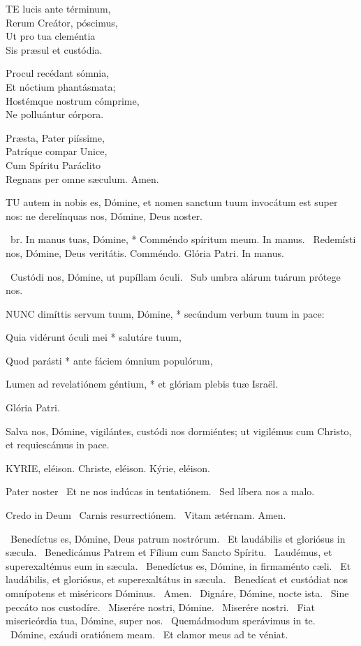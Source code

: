 \lettrine[lines=2]{T}{E} lucis ante términum,\\
Rerum Creátor, póscimus,\\
Ut pro tua cleméntia\\
Sis præsul et custódia.

Procul recédant sómnia,\\
Et nóctium phantásmata;\\
Hostémque nostrum cómprime,\\
Ne polluántur córpora.

Præsta, Pater piíssime,\\
Patríque compar Unice,\\
Cum Spíritu Paráclito\\
Regnans per omne sæculum. Amen.


\lettrine[lines=2]{T}{U} autem in nobis es, Dómine, et nomen sanctum tuum invocátum est super nos: ne derelínquas nos, Dómine, Deus noster.

\R\ br. In manus tuas, Dómine, * Comméndo spíritum meum. In manus. \V\ Redemísti nos, Dómine, Deus veritátis. Comméndo. Glória Patri. In manus.

\V\ Custódi nos, Dómine, ut pupíllam óculi. \R\ Sub umbra alárum tuárum prótege nos.


\lettrine[lines=2]{N}{UNC} dimíttis servum tuum, Dómine, * secúndum verbum tuum in pace:

Quia vidérunt óculi mei * salutáre tuum,

Quod parásti * ante fáciem ómnium populórum,

Lumen ad revelatiónem géntium, * et glóriam plebis tuæ Israël.

Glória Patri.

 Salva nos, Dómine, vigilántes, custódi nos dormiéntes; ut vigilémus cum Christo, et requiescámus in pace.


KYRIE, eléison. Christe, eléison. Kýrie, eléison.

Pater noster  \V\ Et ne nos indúcas in tentatiónem. \R\ Sed líbera nos a malo.

Credo in Deum  \V\ Carnis resurrectiónem. \R\ Vitam ætérnam. Amen.

\V\ Benedíctus es, Dómine, Deus patrum nostrórum. \R\ Et laudábilis et gloriósus in sæcula. \V\ Benedicámus Patrem et Fílium cum Sancto Spíritu. \R\ Laudémus, et superexaltémus eum in sæcula. \V\ Benedíctus es, Dómine, in firmaménto cæli. \R\ Et laudábilis, et gloriósus, et superexaltátus in sæcula. \V\ Benedícat et custódiat nos omnípotens et miséricors Dóminus. \R\ Amen. \V\ Dignáre, Dómine, nocte ista. \R\ Sine peccáto nos custodíre. \V\ Miserére nostri, Dómine. \R\ Miserére nostri. \V\ Fiat misericórdia tua, Dómine, super nos. \R\ Quemádmodum sperávimus in te. \V\ Dómine, exáudi oratiónem meam. \R\ Et clamor meus ad te véniat.

